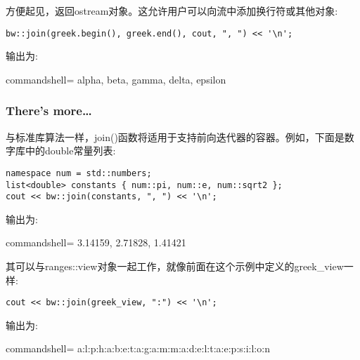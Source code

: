 方便起见，返回ostream对象。这允许用户可以向流中添加换行符或其他对象:

\begin{lstlisting}[style=styleCXX]
bw::join(greek.begin(), greek.end(), cout, ", ") << '\n';
\end{lstlisting}

输出为:

\begin{tcblisting}{commandshell={}}
alpha, beta, gamma, delta, epsilon
\end{tcblisting}

\subsubsection{There's more…}

与标准库算法一样，join()函数将适用于支持前向迭代器的容器。例如，下面是数字库中的double常量列表:

\begin{lstlisting}[style=styleCXX]
namespace num = std::numbers;
list<double> constants { num::pi, num::e, num::sqrt2 };
cout << bw::join(constants, ", ") << '\n';
\end{lstlisting}

输出为:

\begin{tcblisting}{commandshell={}}
3.14159, 2.71828, 1.41421
\end{tcblisting}

其可以与ranges::view对象一起工作，就像前面在这个示例中定义的greek\_view一样:

\begin{lstlisting}[style=styleCXX]
cout << bw::join(greek_view, ":") << '\n';
\end{lstlisting}

输出为:

\begin{tcblisting}{commandshell={}}
a:l:p:h:a:b:e:t:a:g:a:m:m:a:d:e:l:t:a:e:p:s:i:l:o:n
\end{tcblisting}

